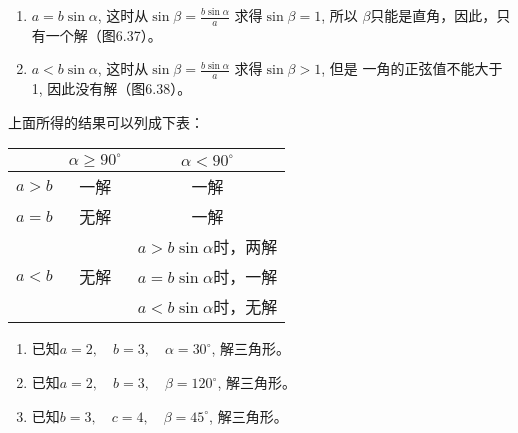 \begin{enumerate}
\begin{enumerate}
  \item $a=b\sin\alpha$, 这时从$\sin\beta=\frac{b\sin\alpha}{a}$
    求得$\sin\beta=1$, 所以
    $\beta$只能是直角，因此，只有一个解（图6.37）。
\item $a<b\sin\alpha$, 这时从$\sin\beta=\frac{b\sin\alpha}{a}$
    求得$\sin\beta>1$, 但是
    一角的正弦值不能大于1, 因此没有解（图6.38）。
\end{enumerate}
\end{enumerate}

\begin{figure}[htp]\centering
    \begin{minipage}[t]{0.48\textwidth}
    \centering
{}
    \caption{}
    \end{minipage}
    \begin{minipage}[t]{0.48\textwidth}
    \centering
    \caption{}
    \end{minipage}
    \end{figure}

上面所得的结果可以列成下表：
\begin{center}
\begin{tabular}{c|c|c}
\hline
& $\alpha\ge 90^{\circ}$ &$\alpha<90^{\circ}$\\
\hline
$a>b$& 一解&一解\\ \hline
$a=b$&无解&一解\\
\hline
& & $a>b\sin\alpha$时，两解\\
$a<b$ &无解 & $a=b\sin\alpha$时，一解\\
& & $a<b\sin\alpha$时，无解\\
\hline
\end{tabular}
\end{center}



\begin{ex}
\begin{enumerate}
\item 已知$a=2,\quad b=3,\quad \alpha=30^{\circ}$, 解三角形。
\item 已知$a=2,\quad b=3,\quad \beta=120^{\circ}$, 解三角形。
\item 已知$b=3,\quad c=4,\quad \beta=45^{\circ}$, 解三角形。
\end{enumerate}   
\end{ex}

